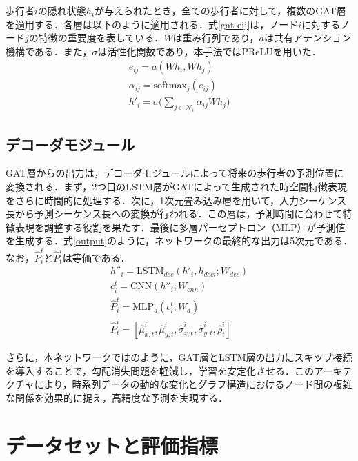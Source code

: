 歩行者$i$の隠れ状態$h_i$が与えられたとき，全ての歩行者に対して，複数のGAT層を適用する．各層は以下のように適用される．式\eqref{gat-eij}は，ノード$i$に対するノード$j$の特徴の重要度を表している．$W$は重み行列であり，$a$は共有アテンション機構である．また，$\sigma$は活性化関数であり，本手法ではPReLU\cite{he2015delving-prelu}を用いた．
\begin{align}
  e_{ij} = a(Wh_i, Wh_j) \label{gat-eij} \\
  \alpha_{ij} = \text{softmax}_{j}(e_{ij}) \\
  h'_i = \sigma\Bigg(\sum_{j \in \mathcal{N}_i} \alpha_{ij}Wh_j \Bigg)
\end{align}

\subsection{デコーダモジュール}
GAT層からの出力は，デコーダモジュールによって将来の歩行者の予測位置に変換される．まず，2つ目のLSTM層がGATによって生成された時空間特徴表現をさらに時間的に処理する．次に，1次元畳み込み層を用いて，入力シーケンス長から予測シーケンス長への変換が行われる．この層は，予測時間に合わせて特徴表現を調整する役割を果たす．最後に多層パーセプトロン（MLP）が予測値を生成する．式\eqref{output}のように，ネットワークの最終的な出力は5次元である．なお，$\hat{P}^t_i\text{と}\hat{P}^i_t$は等価である．
\begin{align}
  h''_i = \text{LSTM}_{dec}(h'_i, h_{deci}; W_{dec})\\
  c^t_i = \text{CNN}(h''_i; W_{cnn}) \\
  \hat{P}^t_i = \text{MLP}_{d}(c^t_i; W_{d}) \\
  \hat{P}^i_t = [\hat{\mu}^i_{x,t}, \hat{\mu}^i_{y, t}, \hat{\sigma}^i_{x, t}, \hat{\sigma}^i_{y, t}, \hat{\rho}^i_t] \label{output}
\end{align}

さらに，本ネットワークではのように，GAT層とLSTM層の出力にスキップ接続\cite{he2016deep-resnet}を導入することで，勾配消失問題\cite{hochreiter2001gradient-grad,weinleindiplomarbeit-grad, schmidhuber2015deep-grad}を軽減し，学習を安定化させる．このアーキテクチャにより，時系列データの動的な変化とグラフ構造におけるノード間の複雑な関係を効果的に捉え，高精度な予測を実現する．

\section{データセットと評価指標}

